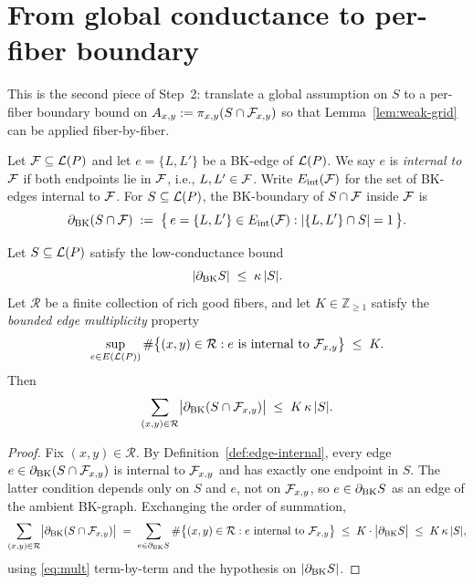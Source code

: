\section{From global conductance to per-fiber boundary}
\label{sec:global-to-local}

This is the second piece of Step~2: translate a global assumption on $S$ to a per-fiber
boundary bound on $A_{x,y} := \pi_{x,y}(S \cap \mathcal{F}_{x,y})$ so that
Lemma~\ref{lem:weak-grid} can be applied fiber-by-fiber.

\begin{definition}\label{def:edge-internal}
Let $\mathcal{F}\subseteq\mathcal{L}(P)$ and let $e=\{L,L'\}$ be a BK-edge of $\mathcal{L}(P)$. We say
$e$ is \emph{internal to $\mathcal{F}$} if both endpoints lie in $\mathcal{F}$, i.e.,
$L,L'\in\mathcal{F}$. Write $E_{\mathrm{int}}(\mathcal{F})$ for the set of BK-edges internal to
$\mathcal{F}$. For $S\subseteq\mathcal{L}(P)$, the BK-boundary of $S\cap\mathcal{F}$ inside $\mathcal{F}$ is
\[
\partial_{\mathrm{BK}}(S\cap\mathcal{F})
  \;:=\; \bigl\{\,e=\{L,L'\}\in E_{\mathrm{int}}(\mathcal{F}) :
         |\{L,L'\}\cap S|=1\,\bigr\}.
\]
\end{definition}

\begin{lemma}\label{lem:fiber-avg}
Let $S\subseteq\mathcal{L}(P)$ satisfy the low-conductance bound
\[
|\partial_{\mathrm{BK}} S| \;\le\; \kappa\,|S|.
\]
Let $\mathcal{R}$ be a finite collection of rich good fibers, and let
$K\in\mathbb{Z}_{\ge 1}$ satisfy the \emph{bounded edge multiplicity} property
\begin{equation}\label{eq:mult}
\sup_{e\in E(\mathcal{L}(P))}
  \#\bigl\{(x,y)\in\mathcal{R} : e\text{ is internal to }\mathcal{F}_{x,y}\bigr\}
  \;\le\; K.
\end{equation}
Then
\begin{equation}\label{eq:fiber-avg}
\sum_{(x,y)\in\mathcal{R}}
  \bigl|\partial_{\mathrm{BK}}(S\cap\mathcal{F}_{x,y})\bigr|
  \;\le\; K\,\kappa\,|S|.
\end{equation}
\end{lemma}

\begin{proof}
Fix $(x,y)\in\mathcal{R}$. By Definition~\ref{def:edge-internal}, every edge
$e\in\partial_{\mathrm{BK}}(S\cap\mathcal{F}_{x,y})$ is internal to $\mathcal{F}_{x,y}$ and has
exactly one endpoint in $S$. The latter condition depends only on $S$ and $e$,
not on $\mathcal{F}_{x,y}$, so $e\in\partial_{\mathrm{BK}} S$ as an edge of the ambient
BK-graph. Exchanging the order of summation,
\[
\sum_{(x,y)\in\mathcal{R}}
  \bigl|\partial_{\mathrm{BK}}(S\cap\mathcal{F}_{x,y})\bigr|
  \;=\; \sum_{e\in\partial_{\mathrm{BK}} S}
         \#\bigl\{(x,y)\in\mathcal{R} : e\text{ internal to }\mathcal{F}_{x,y}\bigr\}
  \;\le\; K\cdot\bigl|\partial_{\mathrm{BK}} S\bigr|
  \;\le\; K\,\kappa\,|S|,
\]
using \eqref{eq:mult} term-by-term and the hypothesis on $|\partial_{\mathrm{BK}} S|$.
\end{proof}

